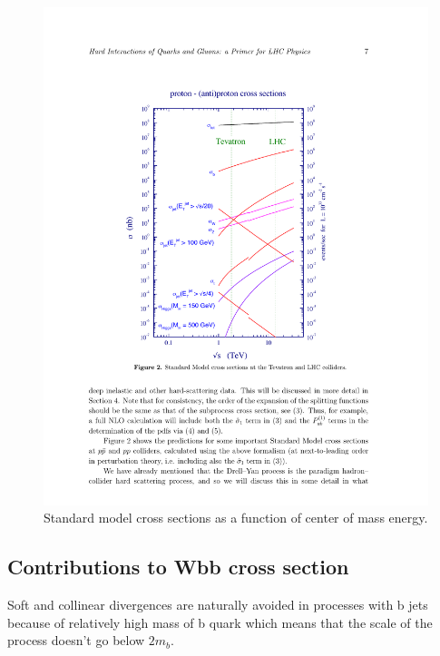 \begin{figure}[htbp]
	\centering
		\includegraphics{Figures/pp_xsec.pdf}
	\caption[Proton-proton cross sections]{Standard model cross sections as a function of center of mass energy.\cite{Campbell:2006wx} }
	\label{fig:pp_xsec}
\end{figure}


\subsection{Contributions to Wbb cross section}

\par Soft and collinear divergences are naturally avoided in processes with b jets because of relatively high mass of b quark which means that the scale of the process doesn't go below $2m_b$.  



